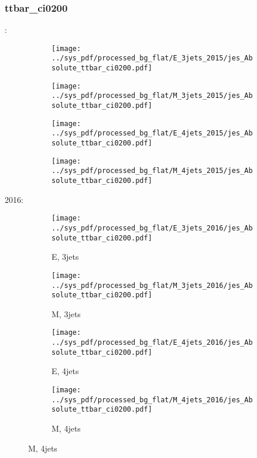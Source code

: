 \documentclass{beamer}
\begin{document}
\begin{frame}
\frametitle{ttbar_ci0200}
\fontsize{5}{1}:
\begin{figure}
\centering
\begin{subfigure}[b]{0.24\textwidth}
\texttt{[image: ../sys\_pdf/processed\_bg\_flat/E\_3jets\_2015/jes\_Absolute\_ttbar\_ci0200.pdf]}
\end{subfigure}
\begin{subfigure}[b]{0.24\textwidth}
\texttt{[image: ../sys\_pdf/processed\_bg\_flat/M\_3jets\_2015/jes\_Absolute\_ttbar\_ci0200.pdf]}
\end{subfigure}
\begin{subfigure}[b]{0.24\textwidth}
\texttt{[image: ../sys\_pdf/processed\_bg\_flat/E\_4jets\_2015/jes\_Absolute\_ttbar\_ci0200.pdf]}
\end{subfigure}
\begin{subfigure}[b]{0.24\textwidth}
\texttt{[image: ../sys\_pdf/processed\_bg\_flat/M\_4jets\_2015/jes\_Absolute\_ttbar\_ci0200.pdf]}
\end{subfigure}
\end{figure}
2016:
\begin{figure}
\centering
\begin{subfigure}[b]{0.24\textwidth}
\texttt{[image: ../sys\_pdf/processed\_bg\_flat/E\_3jets\_2016/jes\_Absolute\_ttbar\_ci0200.pdf]}
\captionsetup{font=tiny}
\caption{E, 3jets}
\end{subfigure}
\begin{subfigure}[b]{0.24\textwidth}
\texttt{[image: ../sys\_pdf/processed\_bg\_flat/M\_3jets\_2016/jes\_Absolute\_ttbar\_ci0200.pdf]}
\captionsetup{font=tiny}
\caption{M, 3jets}
\end{subfigure}
\begin{subfigure}[b]{0.24\textwidth}
\texttt{[image: ../sys\_pdf/processed\_bg\_flat/E\_4jets\_2016/jes\_Absolute\_ttbar\_ci0200.pdf]}
\captionsetup{font=tiny}
\caption{E, 4jets}
\end{subfigure}
\begin{subfigure}[b]{0.24\textwidth}
\texttt{[image: ../sys\_pdf/processed\_bg\_flat/M\_4jets\_2016/jes\_Absolute\_ttbar\_ci0200.pdf]}
\captionsetup{font=tiny}
\caption{M, 4jets}
\end{subfigure}
\end{figure}
\end{frame}
\end{document}
